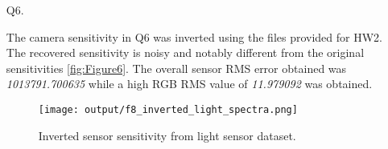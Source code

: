 \documentclass[12pt]{report}
\begin{document}
\begin{enumerate}
    \item[Q6.] 

    The camera sensitivity in Q6 was inverted using the files provided for HW2. The recovered sensitivity is noisy and 
    notably different from the original sensitivities \autoref{fig:Figure6}. The overall sensor RMS error obtained was 
    \emph{1013791.700635} while a high RGB RMS value of \emph{11.979092} was obtained.


    \begin{figure}[ht!]
        \centering
        \texttt{[image: output/f8\_inverted\_light\_spectra.png]}
        \caption{Inverted sensor sensitivity from light sensor dataset.}
        \label{fig:Figure6}
    \end{figure}

    







\end{enumerate}
\end{document}
